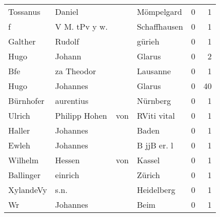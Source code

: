 \begin{center}
\begin{tiny}
\begin{longtabu}{llllrr}
                 Tossanus &                             Daniel &             &                                  Mömpelgard &          0 &         1 \\
                        f &                      V M. tPv y w. &             &                                Schaffhausen &          0 &         1 \\
                  Galther &                             Rudolf &             &                                      gürieh &          0 &         1 \\
                     Hugo &                             Johann &             &                                      Glarus &          0 &         2 \\
                      Bfe &                         za Theodor &             &                                    Lausanne &          0 &         1 \\
                     Hugo &                           Johannes &             &                                      Glarus &          0 &        40 \\
                Bürnhofer &                          aurentius &             &                                    Nürnberg &          0 &         1 \\
                   Ulrich &                     Philipp  Hohen &         von &                                 RViti vital &          0 &         1 \\
                   Haller &                           Johannes &             &                                       Baden &          0 &         1 \\
                    Ewleh &                           Johannes &             &                                 B jjB er. l &          0 &         1 \\
                  Wilhelm &                             Hessen &         von &                                      Kassel &          0 &         1 \\
                Ballinger &                            einrich &             &                                      Zürich &          0 &         1 \\
                XylandeVy &                               s.n. &             &                                  Heidelberg &          0 &         1 \\
                       Wr &                           Johannes &             &                                        Beim &          0 &         1 \\

\end{longtabu}
\end{tiny}
\end{center}
